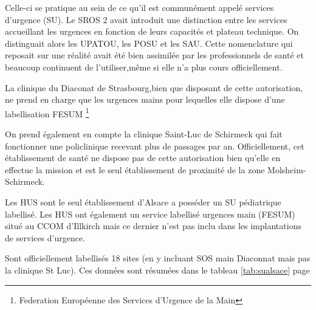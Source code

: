 \documentclass[12pt,english,french,twoside]{report}\usepackage[]{graphicx}\usepackage[]{color}
\begin{document}
Celle-ci se pratique au sein de ce qu'il est communément appelé services d'urgence (SU). Le SROS 2 avait introduit une distinction entre les services accueillant les urgences en fonction de leurs capacités et plateau technique. On distinguait alors les UPATOU, les POSU et les SAU. Cette nomenclature qui reposait sur une réalité avait été bien assimilée par les professionnels de santé et beaucoup continuent de l'utiliser,même si elle n'a plus cours officiellement. 

La clinique du Diaconat de Strasbourg,bien que disposant de cette autorisation, ne prend en charge que les urgences mains pour lequelles elle dispose d'une labellisation FESUM \footnote{Federation Européenne des Services d'Urgence de la Main}

On prend également en compte la clinique Saint-Luc de Schirmeck qui fait fonctionner une policlinique recevant plus de  passages par an. Officiellement, cet établissement de santé ne dispose pas de cette autorisation bien qu'elle en effectue la mission et est le seul établissement de proximité de la zone Molsheim-Schirmeck.

Les HUS sont le seul établissement d'Alsace a posséder un SU pédiatrique labellisé. Les HUS ont également un service labellisé urgences main (FESUM) situé au CCOM d'Illkirch mais ce dernier n'est pas inclu dans les implantations de services d'urgence.

Sont officiellement labellisés 18 sites (en y incluant SOS main Diaconnat mais pas la clinique St Luc). Ces données sont résumées dans le tableau \ref{tab:sualsace} page \pageref{tab:sualsace}
\end{document}
